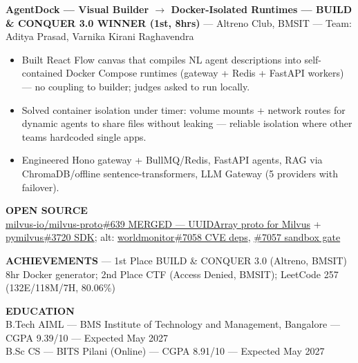 \documentclass[10pt,a4paper]{article}
\begin{document}
\noindent\textbf{AgentDock — Visual Builder $\rightarrow$ Docker-Isolated Runtimes — BUILD \& CONQUER 3.0 WINNER (1st, 8hrs)} — Altreno Club, BMSIT — Team: Aditya Prasad, Varnika Kirani Raghavendra
\begin{itemize}[leftmargin=12pt, itemsep=1pt, topsep=1pt]
\item Built React Flow canvas that compiles NL agent descriptions into self-contained Docker Compose runtimes (gateway + Redis + FastAPI workers) — no coupling to builder; judges asked to run locally.
\item Solved container isolation under timer: volume mounts + network routes for dynamic agents to share files without leaking — reliable isolation where other teams hardcoded single apps.
\item Engineered Hono gateway + BullMQ/Redis, FastAPI agents, RAG via ChromaDB/offline sentence-transformers, LLM Gateway (5 providers with failover).
\end{itemize}

\vspace{6pt}
\noindent\textbf{OPEN SOURCE}\\
\small \href{https://github.com/milvus-io/milvus-proto/pull/639}{milvus-io/milvus-proto\#639 MERGED — UUIDArray proto for Milvus} + \href{https://github.com/milvus-io/pymilvus/pull/3720}{pymilvus\#3720 SDK}; alt: \href{https://github.com/koala73/worldmonitor/pull/7058}{worldmonitor\#7058 CVE deps}, \href{https://github.com/koala73/worldmonitor/pull/7057}{\#7057 sandbox gate}

\vspace{4pt}
\noindent\textbf{ACHIEVEMENTS} — 1st Place BUILD \& CONQUER 3.0 (Altreno, BMSIT) 8hr Docker generator; 2nd Place CTF (Access Denied, BMSIT); LeetCode 257 (132E/118M/7H, 80.06\%)

\vspace{4pt}
\noindent\textbf{EDUCATION}\\
\small B.Tech AIML — BMS Institute of Technology and Management, Bangalore — CGPA 9.39/10 — Expected May 2027 \\
\small B.Sc CS — BITS Pilani (Online) — CGPA 8.91/10 — Expected May 2027
\end{document}
